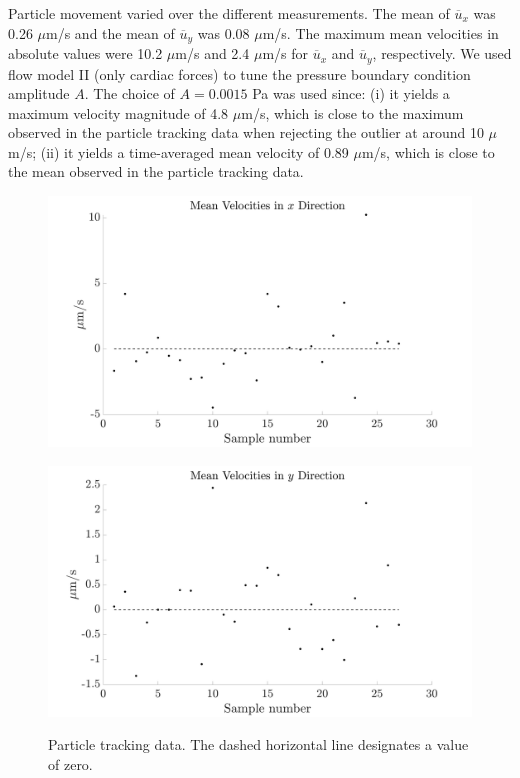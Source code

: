 \documentclass[fleqn]{wlscirep}
\begin{document}
Particle movement varied over the different measurements. The mean of $\overline{u}_x$ was
0.26 $\mu$m/s and the mean of $\overline{u}_y$ was 0.08 $\mu$m/s. The maximum mean velocities
in absolute values were 10.2 $\mu$m/s and 2.4 $\mu$m/s for $\overline{u}_x$ and $\overline{u}_y$,
respectively. We used flow model II (only cardiac forces) to tune the pressure boundary condition
amplitude $A$. The choice of $A=0.0015$ Pa was used since: (i) it yields a maximum velocity magnitude
of 4.8 $\mu$m/s, which is close to the maximum observed in the particle tracking data when
rejecting the outlier at around 10 $\mu$m/s; (ii) it yields a time-averaged mean velocity
of 0.89 $\mu$m/s, which is close to the mean observed in the particle tracking data.
\begin{figure}[H]
    \begin{minipage}[t]{0.49\textwidth}
        \includegraphics[width=\textwidth]{graphics/mean_velocities_x.png}
        \label{fig:meanx}
    \end{minipage}
    \begin{minipage}[t]{0.49\textwidth}
        \includegraphics[width=\textwidth]{graphics/mean_velocities_y.png}
        \label{fig:meany}
    \end{minipage} 
    \caption{Particle tracking data. The dashed horizontal line designates a value of zero.}\label{fig:particle_tracking_data}
\end{figure}
\clearpage
{}
\end{document}
